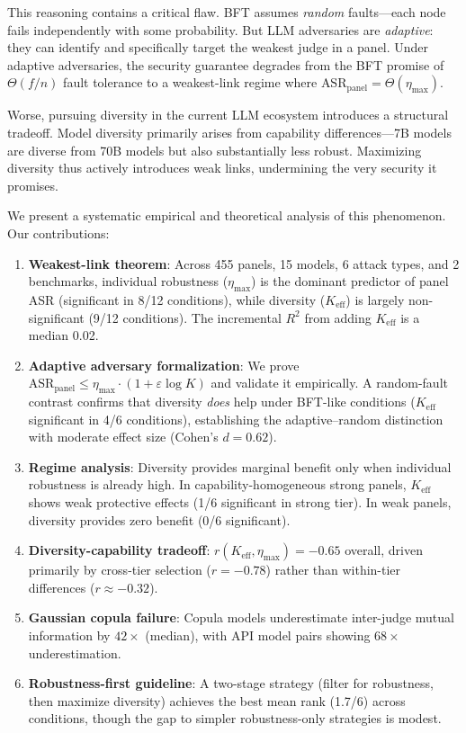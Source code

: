 \documentclass[11pt,a4paper]{article}
\begin{document}
This reasoning contains a critical flaw. BFT assumes \emph{random} faults---each node fails independently with some probability. But LLM adversaries are \emph{adaptive}: they can identify and specifically target the weakest judge in a panel. Under adaptive adversaries, the security guarantee degrades from the BFT promise of $\Theta(f/n)$ fault tolerance to a weakest-link regime where $\text{ASR}_{\text{panel}} = \Theta(\eta_{\max})$.

Worse, pursuing diversity in the current LLM ecosystem introduces a structural tradeoff. Model diversity primarily arises from capability differences---7B models are diverse from 70B models but also substantially less robust. Maximizing diversity thus actively introduces weak links, undermining the very security it promises.

We present a systematic empirical and theoretical analysis of this phenomenon. Our contributions:

\begin{enumerate}
    \item \textbf{Weakest-link theorem}: Across 455 panels, 15 models, 6 attack types, and 2 benchmarks, individual robustness ($\eta_{\max}$) is the dominant predictor of panel ASR (significant in 8/12 conditions), while diversity ($K_{\text{eff}}$) is largely non-significant (9/12 conditions). The incremental $R^2$ from adding $K_{\text{eff}}$ is a median 0.02.

    \item \textbf{Adaptive adversary formalization}: We prove $\text{ASR}_{\text{panel}} \leq \eta_{\max} \cdot (1 + \varepsilon \log K)$ and validate it empirically. A random-fault contrast confirms that diversity \emph{does} help under BFT-like conditions ($K_{\text{eff}}$ significant in 4/6 conditions), establishing the adaptive--random distinction with moderate effect size (Cohen's $d = 0.62$).

    \item \textbf{Regime analysis}: Diversity provides marginal benefit only when individual robustness is already high. In capability-homogeneous strong panels, $K_{\text{eff}}$ shows weak protective effects (1/6 significant in strong tier). In weak panels, diversity provides zero benefit (0/6 significant).

    \item \textbf{Diversity-capability tradeoff}: $r(K_{\text{eff}}, \eta_{\max}) = -0.65$ overall, driven primarily by cross-tier selection ($r = -0.78$) rather than within-tier differences ($r \approx -0.32$).

    \item \textbf{Gaussian copula failure}: Copula models underestimate inter-judge mutual information by $42\times$ (median), with API model pairs showing $68\times$ underestimation.

    \item \textbf{Robustness-first guideline}: A two-stage strategy (filter for robustness, then maximize diversity) achieves the best mean rank (1.7/6) across conditions, though the gap to simpler robustness-only strategies is modest.
\end{enumerate}
\end{document}
